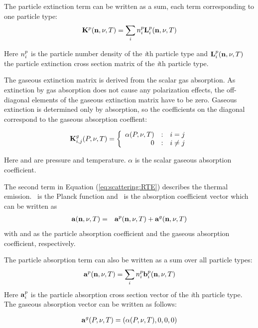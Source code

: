 The particle extinction term can be written as a sum, each term
corresponding to one particle type:
\begin{eqnarray}
  {\bf K}^{p}({\bf n}, \nu, T) = \sum_i n^p_i {\bf L}^{p}_i ({\bf n}, \nu, T)
\end{eqnarray}

Here $n^p_i$ is the particle number density of the {\sl i}th
particle type and ${\bf L}^{p}_i({\bf n}, \nu, T)$ the particle extinction cross
section matrix of the {\sl i}th particle type.


The gaseous extinction matrix is derived from the scalar gas
absorption. As extinction by gas absorption does not cause any
polarization effects, the off-diagonal elements of the gaseous
extinction matrix have to be zero. Gaseous extinction is determined
only by absorption, so the coefficients on the diagonal correspond to
the gaseous absorption coeffient:

\[
\aExtMat{g}_{i,j}(\Prs, \Frq, \Tmp) =
\left\{\begin{array}{r@{\quad:\quad}l} \alpha(\Prs, \Frq, \Tmp) & i =
    j \\ 0 & i \not= j \end{array} \right.
\]

Here \Prs and \Tmp are pressure and temperature. $\alpha$ is the
scalar gaseous absorption coefficient.

The second term in Equation (\ref{eq:scattering:RTE}) describes the
thermal emission. \Planck\ is the Planck function and \AbsVec\ is the
absorption coefficient vector which can be written as
\begin{eqnarray}
  {\bf a} ({\bf n}, \nu, T)  &=& {\bf a}^{p} ({\bf n}, \nu, T) + {\bf a}^{g} ({\bf n}, \nu, T) 
\end{eqnarray}
with  and  as the particle absorption
coefficient and the gaseous absorption coefficient, respectively.

The particle absorption term can also be written as a sum over all
particle types:
\begin{eqnarray}
  {\bf a}^{p}({\bf n}, \nu, T) = \sum_i n^p_i {\bf b}^{p}_i ({\bf n}, \nu, T)
\end{eqnarray}
Here ${\bf a}^{p}_i$ is the particle absorption cross section vector
of the {\sl i}th particle type.  The gaseous absorption vector can be
written as follows:

\begin{eqnarray}
  {\bf a}^{g}(P, \nu, T)  = (\alpha(P, \nu, T), 0, 0, 0) 
\end{eqnarray}


